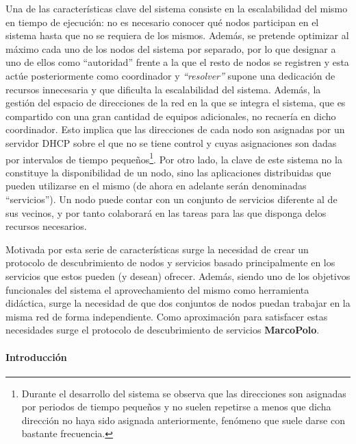 Una de las características clave del sistema consiste en la escalabilidad del mismo en tiempo de ejecución: no es necesario conocer qué nodos participan en el sistema hasta que no se requiera de los mismos. Además, se pretende optimizar al máximo cada uno de los nodos del sistema por separado, por lo que designar a uno de ellos como ``autoridad'' frente a la que el resto de nodos se registren y esta actúe posteriormente como coordinador y \textit{``resolver''} supone una dedicación de recursos innecesaria y que dificulta la escalabilidad del sistema. Además, la gestión del espacio de direcciones de la red en la que se integra el sistema, que es compartido con una gran cantidad de equipos adicionales, no recaería en dicho coordinador. Esto implica que las direcciones de cada nodo son asignadas por un servidor DHCP sobre el que no se tiene control y cuyas asignaciones son dadas por intervalos de tiempo pequeños\footnote{Durante el desarrollo del sistema se observa que las direcciones son asignadas por periodos de tiempo pequeños y no suelen repetirse a menos que dicha dirección no haya sido asignada anteriormente, fenómeno que suele darse con bastante frecuencia.}. %
Por otro lado, la clave de este sistema no la constituye la disponibilidad de un nodo, sino las aplicaciones distribuidas que pueden utilizarse en el mismo (de ahora en adelante serán denominadas ``servicios''). Un nodo puede contar con un conjunto de servicios diferente al de sus vecinos, y por tanto colaborará en las tareas para las que disponga delos recursos necesarios.%

Motivada por esta serie de características surge la necesidad de crear un protocolo de descubrimiento de nodos y servicios basado principalmente en los servicios que estos pueden (y desean) ofrecer. Además, siendo uno de los objetivos funcionales del sistema el aprovechamiento del mismo como herramienta didáctica, surge la necesidad de que dos conjuntos de nodos puedan trabajar en la misma red de forma independiente. Como aproximación para satisfacer estas necesidades surge el protocolo de descubrimiento de servicios \textbf{MarcoPolo}.

\paragraph{Introducción\\}

